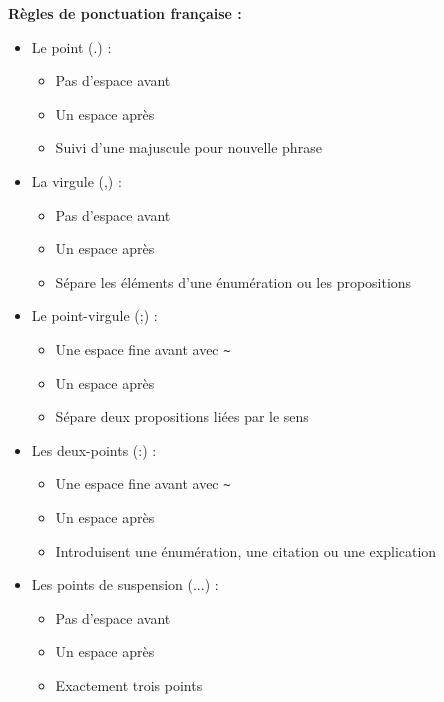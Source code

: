 \begin{tcolorbox}[
    enhanced,
    title={\textbf{Attention : Règles de ponctuation en français}},
    colback=yellow!10,
    colframe=red!75!black,
    colbacktitle=red!85!black,
    coltitle=white,
    fonttitle=\large\bfseries,
    boxrule=0.5mm
]

\textbf{Règles de ponctuation française :}

\begin{itemize}[leftmargin=*]
    \item Le point (.) : 
        \begin{itemize}
            \item Pas d'espace avant
            \item Un espace après
            \item Suivi d'une majuscule pour nouvelle phrase
        \end{itemize}
    
    \item La virgule (,) :
        \begin{itemize}
            \item Pas d'espace avant
            \item Un espace après
            \item Sépare les éléments d'une énumération ou les propositions
        \end{itemize}
    
    \item Le point-virgule (;) :
        \begin{itemize}
            \item Une espace fine avant avec \verb|~|
            \item Un espace après
            \item Sépare deux propositions liées par le sens
        \end{itemize}
    
    \item Les deux-points (:) :
        \begin{itemize}
            \item Une espace fine avant avec \verb|~|
            \item Un espace après
            \item Introduisent une énumération, une citation ou une explication
        \end{itemize}
    
    \item Les points de suspension (...) :
        \begin{itemize}
            \item Pas d'espace avant
            \item Un espace après
            \item Exactement trois points
        \end{itemize}
    

\end{itemize}
\end{tcolorbox}
